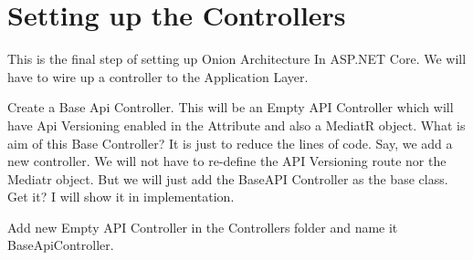 \documentclass[letterpaper,10pt,english]{sphinxmanual}
\begin{document}
\begin{sphinxVerbatim}[commandchars=\\\{\}]
 
        
      
      
\end{sphinxVerbatim}


\section{Setting up the Controllers}
\label{\detokenize{OnionArchitecture/details:setting-up-the-controllers}}
This is the final step of setting up Onion Architecture In ASP.NET Core. We will have to wire up a controller to the Application Layer.

Create a Base Api Controller. This will be an Empty API Controller which will have Api Versioning enabled in the Attribute and also a MediatR object. What is aim of this Base Controller? It is just to reduce the lines of code. Say, we add a new controller. We will not have to re-define the API Versioning route nor the Mediatr object. But we will just add the BaseAPI Controller as the base class. Get it? I will show it in implementation.

Add new Empty API Controller in the Controllers folder and name it BaseApiController.
\end{document}
